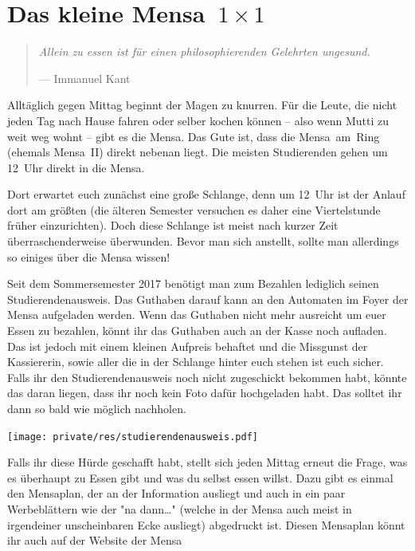 \section[Das kleine Mensa~1~×~1]{\boldmath Das kleine Mensa~${1 \times 1}$}
\begin{multicols*}{2}
\begin{quote}
	\textit{Allein zu essen ist für einen philosophierenden Gelehrten ungesund.}
	
	\hfill--- Immanuel Kant
\end{quote}

Alltäglich gegen Mittag beginnt der Magen zu knurren.
Für die Leute, die nicht jeden Tag nach Hause fahren oder selber kochen können -- also wenn Mutti zu weit weg wohnt -- gibt es die Mensa.
Das Gute ist, dass die Mensa~am~Ring (ehemals Mensa~II) direkt nebenan liegt.
Die meisten Studierenden gehen um 12~Uhr direkt in die Mensa.

Dort erwartet euch zunächst eine große Schlange, denn um 12~Uhr ist der Anlauf dort am größten (die älteren Semester versuchen es daher eine Viertelstunde früher einzurichten).
Doch diese Schlange ist meist nach kurzer Zeit überraschenderweise überwunden.
Bevor man sich anstellt, sollte man allerdings so einiges über die Mensa wissen!

Seit dem Sommersemester 2017 benötigt man zum Bezahlen lediglich seinen Studierendenausweis.
Das Guthaben darauf kann an den Automaten im Foyer der Mensa aufgeladen werden.
Wenn das Guthaben nicht mehr ausreicht um euer Essen zu bezahlen, könnt ihr das Guthaben auch an der Kasse noch aufladen. 
Das ist jedoch mit einem kleinen Aufpreis behaftet und die Missgunst der Kassiererin, sowie aller die in der Schlange hinter euch stehen ist euch sicher.
Falls ihr den Studierendenausweis noch nicht zugeschickt bekommen habt, könnte das daran liegen, dass ihr noch kein Foto dafür hochgeladen habt.
Das solltet ihr dann so bald wie möglich nachholen.

\begin{center}
	\texttt{[image: private/res/studierendenausweis.pdf]}
\end{center}

Falls ihr diese Hürde geschafft habt, stellt sich jeden Mittag erneut die Frage, was es überhaupt zu Essen gibt und was du selbst essen willst.
Dazu gibt es einmal den Mensaplan, der an der Information ausliegt und auch in ein paar Werbeblättern wie der "na dann\dots" (welche in der Mensa auch meist in irgendeiner unscheinbaren Ecke ausliegt) abgedruckt ist.
Diesen Mensaplan könnt ihr auch auf der Website der Mensa


\end{multicols*}
